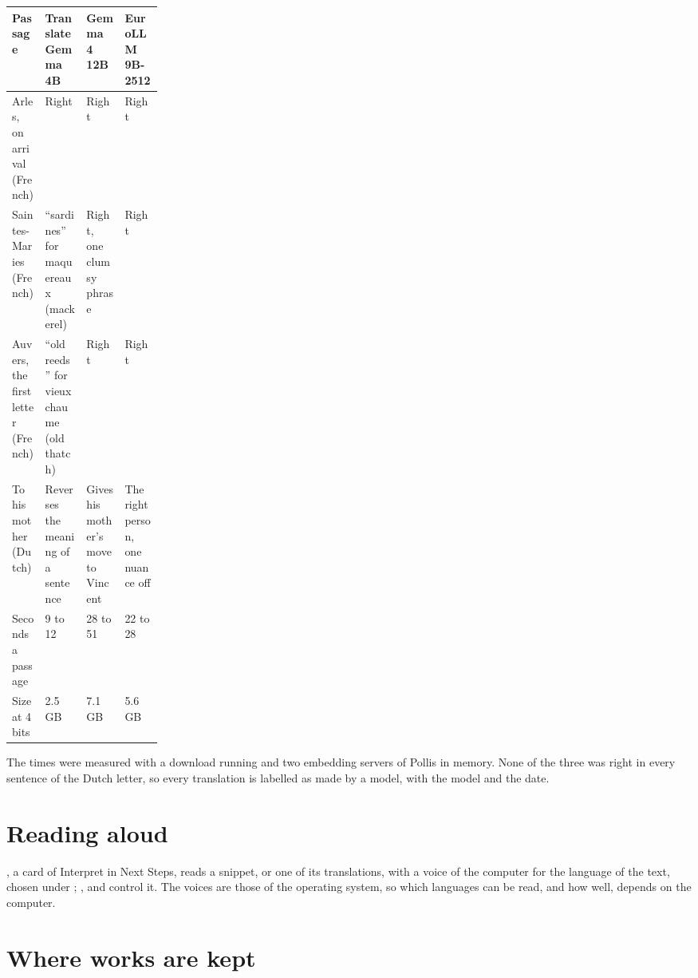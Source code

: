 \begin{center}\small
\begin{tabularx}{\linewidth}{@{}p{0.22\linewidth}LLL@{}}
\toprule
\textbf{Passage} & \textbf{TranslateGemma 4B} & \textbf{Gemma 4 12B} & \textbf{EuroLLM 9B-2512} \\
\midrule
Arles, on arrival (French) & Right & Right & Right \\
Saintes-Maries (French) & ``sardines'' for maquereaux (mackerel) & Right, one clumsy phrase & Right \\
Auvers, the first letter (French) & ``old reeds'' for vieux chaume (old thatch) & Right & Right \\
To his mother (Dutch) & Reverses the meaning of a sentence & Gives his mother's move to Vincent & The right person,
  one nuance off \\
\midrule
Seconds a passage & 9 to 12 & 28 to 51 & 22 to 28 \\
Size at 4 bits & 2.5 GB & 7.1 GB & 5.6 GB \\
\bottomrule
\end{tabularx}
\end{center}

The times were measured with a download running and two embedding servers of Pollis in memory. None of the three was
right in every sentence of the Dutch letter, so every translation is labelled as made by a model, with the model and
the date.

\section{Reading aloud}\label{sec:aloud}
, a card of Interpret in Next Steps, reads a snippet, or one of its translations, with a voice of the computer for the language of the
text, chosen under ; ,  and  control it. The voices are those of the operating
system, so which languages can be read, and how well, depends on the computer.

\section{Where works are kept}\label{sec:where}
